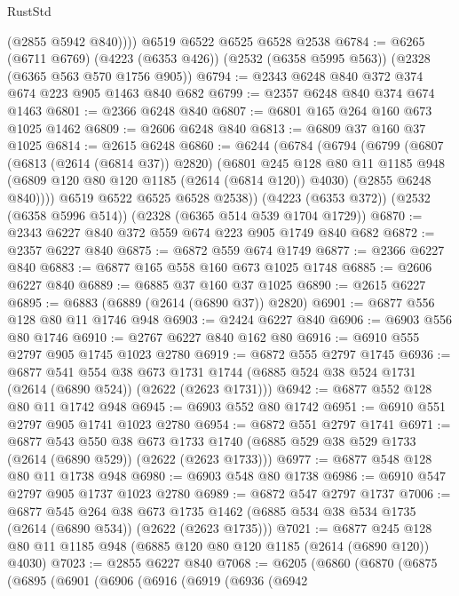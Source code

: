 \begin{lexlean}{RustStd}
\begin{coremodule}
          (@2855 @5942 @840))))
    @6519
    @6522
    @6525
    @6528
    @2538
@6784 := @6265
    (@6711 @6769)
    (@4223 (@6353 @426))
    (@2532 (@6358 @5995 @563))
    (@2328 (@6365 @563 @570 @1756 @905))
@6794 := @2343 @6248 @840 @372 @374 @674 @223 @905 @1463 @840 @682
@6799 := @2357 @6248 @840 @374 @674 @1463
@6801 := @2366 @6248 @840
@6807 := @6801 @165 @264 @160 @673 @1025 @1462
@6809 := @2606 @6248 @840
@6813 := @6809 @37 @160 @37 @1025
@6814 := @2615 @6248
@6860 := @6244
    (@6784
      (@6794
        (@6799
          (@6807
            (@6813 (@2614 (@6814 @37)) @2820)
            (@6801
              @245
              @128
              @80
              @11
              @1185
              @948
              (@6809 @120 @80 @120 @1185 (@2614 (@6814 @120)) @4030)
              (@2855 @6248 @840))))
        @6519
        @6522
        @6525
        @6528
        @2538))
    (@4223 (@6353 @372))
    (@2532 (@6358 @5996 @514))
    (@2328 (@6365 @514 @539 @1704 @1729))
@6870 := @2343 @6227 @840 @372 @559 @674 @223 @905 @1749 @840 @682
@6872 := @2357 @6227 @840
@6875 := @6872 @559 @674 @1749
@6877 := @2366 @6227 @840
@6883 := @6877 @165 @558 @160 @673 @1025 @1748
@6885 := @2606 @6227 @840
@6889 := @6885 @37 @160 @37 @1025
@6890 := @2615 @6227
@6895 := @6883 (@6889 (@2614 (@6890 @37)) @2820)
@6901 := @6877 @556 @128 @80 @11 @1746 @948
@6903 := @2424 @6227 @840
@6906 := @6903 @556 @80 @1746
@6910 := @2767 @6227 @840 @162 @80
@6916 := @6910 @555 @2797 @905 @1745 @1023 @2780
@6919 := @6872 @555 @2797 @1745
@6936 := @6877
    @541
    @554
    @38
    @673
    @1731
    @1744
    (@6885 @524 @38 @524 @1731 (@2614 (@6890 @524)) (@2622 (@2623 @1731)))
@6942 := @6877 @552 @128 @80 @11 @1742 @948
@6945 := @6903 @552 @80 @1742
@6951 := @6910 @551 @2797 @905 @1741 @1023 @2780
@6954 := @6872 @551 @2797 @1741
@6971 := @6877
    @543
    @550
    @38
    @673
    @1733
    @1740
    (@6885 @529 @38 @529 @1733 (@2614 (@6890 @529)) (@2622 (@2623 @1733)))
@6977 := @6877 @548 @128 @80 @11 @1738 @948
@6980 := @6903 @548 @80 @1738
@6986 := @6910 @547 @2797 @905 @1737 @1023 @2780
@6989 := @6872 @547 @2797 @1737
@7006 := @6877
    @545
    @264
    @38
    @673
    @1735
    @1462
    (@6885 @534 @38 @534 @1735 (@2614 (@6890 @534)) (@2622 (@2623 @1735)))
@7021 := @6877 @245 @128 @80 @11 @1185 @948 (@6885 @120 @80 @120 @1185 (@2614 (@6890 @120)) @4030)
@7023 := @2855 @6227 @840
@7068 := @6205
    (@6860
      (@6870
        (@6875
          (@6895
            (@6901
              (@6906
                (@6916
                  (@6919
                    (@6936
                      (@6942

\end{coremodule}
\end{lexlean}
